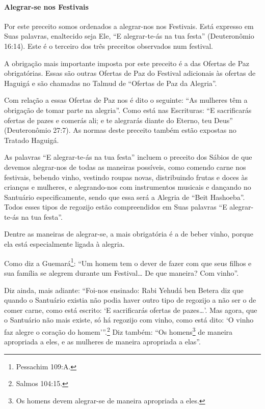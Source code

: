 \paragraph{Alegrar-se nos Festivais}

Por este preceito somos ordenados a alegrar-nos nos Festivais. Está
expresso em Suas palavras, enaltecido seja Ele, ``E alegrar-te-ás na tua
festa'' (Deuteronômio 16:14). Este é o terceiro dos três preceitos
observados num festival.

A obrigação mais importante imposta por este preceito é a das Ofertas
de Paz obrigatórias. Essas são outras Ofertas de Paz do Festival
adicionais às ofertas de Haguigá e são chamadas no Talmud de ``Ofertas
de Paz da Alegria''.

Com relação a essas Ofertas de Paz nos é dito o seguinte: ``As mulheres
têm a obrigação de tomar parte na alegria''. Como está nas Escrituras:
``E sacrificarás ofertas de pazes e comerás ali; e te alegrarás diante
do Eterno, teu Deus'' (Deuteronômio 27:7). As normas deste preceito
também estão expostas no Tratado Haguigá.

As palavras ``E alegrar-te-ás na tua festa'' incluem o preceito dos
Sábios de que devemos alegrar-nos de todas as maneiras possíveis, como
comendo carne nos festivais, bebendo vinho, vestindo roupas novas,
distribuindo frutas e doces às crianças e mulheres, e alegrando-nos com
instrumentos musicais e dançando no Santuário especificamente, sendo que
essa será a Alegria de ``Beit Hashoeba''. Todos esses tipos de regozijo
estão compreendidos em Suas palavras ``E alegrar-te-ás na tua festa''.

Dentre as maneiras de alegrar-se, a mais obrigatória é a de beber vinho, porque ela está especialmente ligada à alegria.

Como diz a Guemará\footnote{Pessachim 109:A.}: ``Um homem tem o dever de fazer
com que seus filhos e sua família se alegrem durante um Festival\ldots{} De que
maneira? Com vinho''.

Diz ainda, mais adiante: ``Foi-nos ensinado: Rabi Yehudá ben Betera diz
que quando o Santuário existia não podia haver outro tipo de regozijo a
não ser o de comer carne, como está escrito: `E sacrificarás ofertas de
pazes\ldots{}'. Mas agora, que o Santuário não mais existe, só há regozijo com
vinho, como está dito: `O vinho faz alegre o coração do homem'''.\footnote{Salmos 104:15.} Diz também:
``Os homens\footnote{Os homens devem alegrar-se de maneira apropriada a eles.} de maneira apropriada a eles, e as
mulheres de maneira apropriada a elas''.

